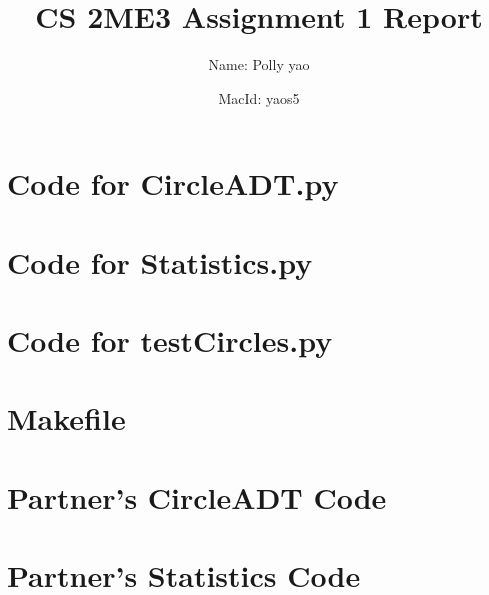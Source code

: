 \documentclass[12pt]{article}
\title{CS 2ME3 Assignment 1 Report}
\author{Name: Polly yao
             \and 
              MacId: yaos5}
\begin{document}
\maketitle

\lstset{language=Python, basicstyle=\tiny,breaklines=true,showspaces=false,showstringspaces=false,breakatwhitespace=true}

\def\thesection{\Alph{section}} 

\section{Code for CircleADT.py} \label{CircleSect}

\noindent 

\newpage

\section{Code for Statistics.py} \label{StatisticsSect}

\noindent 

\newpage

\section{Code for testCircles.py} \label{testSect}

\noindent 

\newpage

\section{Makefile} \label{MakefileSect}

\lstset{language=make}
\noindent 

\newpage

\section{Partner's CircleADT Code} \label{PartnerCodeSect}

\lstset{language=Python}

\noindent 

\newpage

\section{Partner's Statistics Code} \label{PartnerCodeSect}
\end{document}
